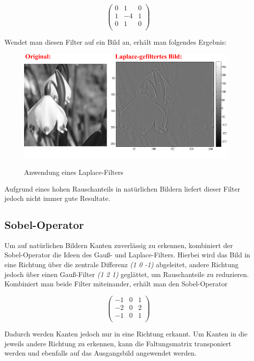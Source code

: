 $$ \left( \begin{array}{rrr}
0 & 1 & 0 \\
1 & -4 & 1 \\
0 & 1 & 0 \\
\end{array}\right) $$

Wendet man diesen Filter auf ein Bild an, erhält man folgendes Ergebnis:

\begin{figure}[ht]
   \centering
     \includegraphics[width=11cm]{Bilder/Laplace} \\
 \caption{Anwendung eines Laplace-Filters}
 \label{fig:Laplace}
\end{figure}

Aufgrund eines hohen Rauschanteils in natürlichen Bildern liefert dieser Filter jedoch nicht immer gute Resultate.

\subsection{Sobel-Operator}
Um auf natürlichen Bildern Kanten zuverlässig zu erkennen, kombiniert der Sobel-Operator die Ideen des Gauß- und Laplace-Filters.
Hierbei wird das Bild in eine Richtung über die zentrale Differenz {\em (1 0 -1)} abgeleitet, andere Richtung jedoch über einen Gauß-Filter {\em (1 2 1)} geglättet,
um Rauschanteile zu reduzieren.
Kombiniert man beide Filter miteinander, erhält man den Sobel-Operator

$$ \left( \begin{array}{rrr}
-1 & 0 & 1 \\
-2 & 0 & 2 \\
-1 & 0 & 1 \\
\end{array}\right) $$

Dadurch werden Kanten jedoch nur in eine Richtung erkannt.
Um Kanten in die jeweils andere Richtung zu erkennen, kann die Faltungsmatrix transponiert werden und ebenfalls auf
das Ausgangsbild angewendet werden.


